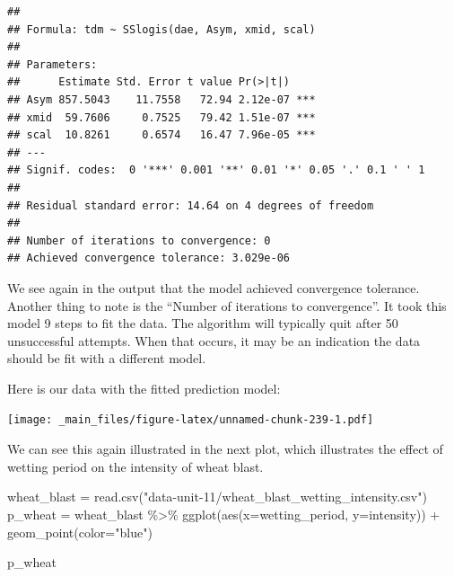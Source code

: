 \documentclass[
]{book}
\newenvironment{Shaded}{\begin{snugshade}}{\end{snugshade}}
\newcommand{\AttributeTok}[1]{\textcolor[rgb]{0.77,0.63,0.00}{#1}}
\newcommand{\DecValTok}[1]{\textcolor[rgb]{0.00,0.00,0.81}{#1}}
\newcommand{\FunctionTok}[1]{\textcolor[rgb]{0.00,0.00,0.00}{#1}}
\newcommand{\NormalTok}[1]{#1}
\newcommand{\OtherTok}[1]{\textcolor[rgb]{0.56,0.35,0.01}{#1}}
\newcommand{\SpecialCharTok}[1]{\textcolor[rgb]{0.00,0.00,0.00}{#1}}
\newcommand{\StringTok}[1]{\textcolor[rgb]{0.31,0.60,0.02}{#1}}
\begin{document}
\begin{verbatim}
## 
## Formula: tdm ~ SSlogis(dae, Asym, xmid, scal)
## 
## Parameters:
##      Estimate Std. Error t value Pr(>|t|)    
## Asym 857.5043    11.7558   72.94 2.12e-07 ***
## xmid  59.7606     0.7525   79.42 1.51e-07 ***
## scal  10.8261     0.6574   16.47 7.96e-05 ***
## ---
## Signif. codes:  0 '***' 0.001 '**' 0.01 '*' 0.05 '.' 0.1 ' ' 1
## 
## Residual standard error: 14.64 on 4 degrees of freedom
## 
## Number of iterations to convergence: 0 
## Achieved convergence tolerance: 3.029e-06
\end{verbatim}

We see again in the output that the model achieved convergence tolerance. Another thing to note is the ``Number of iterations to convergence''. It took this model 9 steps to fit the data. The algorithm will typically quit after 50 unsuccessful attempts. When that occurs, it may be an indication the data should be fit with a different model.

Here is our data with the fitted prediction model:

\begin{Shaded}
\end{Shaded}

\texttt{[image: \_main\_files/figure-latex/unnamed-chunk-239-1.pdf]}

We can see this again illustrated in the next plot, which illustrates the effect of wetting period on the intensity of wheat blast.

\begin{Shaded}
\begin{Highlighting}[]
\NormalTok{wheat\_blast }\OtherTok{=} \FunctionTok{read.csv}\NormalTok{(}\StringTok{"data{-}unit{-}11/wheat\_blast\_wetting\_intensity.csv"}\NormalTok{)}
\NormalTok{p\_wheat }\OtherTok{=}\NormalTok{ wheat\_blast }\SpecialCharTok{\%\textgreater{}\%}
  \FunctionTok{ggplot}\NormalTok{(}\FunctionTok{aes}\NormalTok{(}\AttributeTok{x=}\NormalTok{wetting\_period, }\AttributeTok{y=}\NormalTok{intensity)) }\SpecialCharTok{+}
  \FunctionTok{geom\_point}\NormalTok{(}\AttributeTok{color=}\StringTok{"blue"}\NormalTok{)}

\NormalTok{p\_wheat}
\end{Highlighting}
\end{Shaded}
\end{document}
